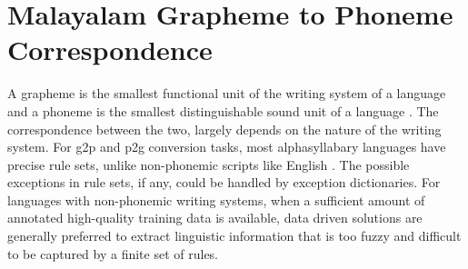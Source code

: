 
\section{Malayalam Grapheme to Phoneme Correspondence}

A grapheme is the smallest functional unit of the writing system of a language and a phoneme is the smallest distinguishable sound unit of a language \cite{Cocoulmas1999blackwellhen07,crystal2011dictionary}. The correspondence between the two, largely depends on the nature of the writing system. For \gls{g2p} and \gls{p2g} conversion tasks, most alphasyllabary languages have precise rule sets, unlike non-phonemic scripts like English \cite{mortensen2018epitran,baby2016unified}. The possible exceptions in rule sets, if any, could be handled by exception dictionaries. For languages with non-phonemic writing systems, when a sufficient amount of annotated high-quality training data is available, data driven solutions are generally preferred to extract linguistic information that is too fuzzy and difficult to be captured by a finite set of rules.



